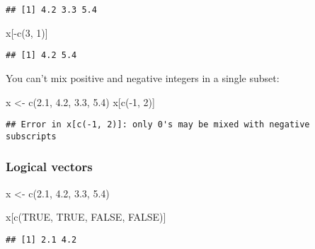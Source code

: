 \documentclass[
]{book}
\newenvironment{Shaded}{\begin{snugshade}}{\end{snugshade}}
\newcommand{\ConstantTok}[1]{\textcolor[rgb]{0.00,0.00,0.00}{#1}}
\newcommand{\DecValTok}[1]{\textcolor[rgb]{0.00,0.00,0.81}{#1}}
\newcommand{\FloatTok}[1]{\textcolor[rgb]{0.00,0.00,0.81}{#1}}
\newcommand{\FunctionTok}[1]{\textcolor[rgb]{0.00,0.00,0.00}{#1}}
\newcommand{\NormalTok}[1]{#1}
\newcommand{\OtherTok}[1]{\textcolor[rgb]{0.56,0.35,0.01}{#1}}
\newcommand{\SpecialCharTok}[1]{\textcolor[rgb]{0.00,0.00,0.00}{#1}}
\begin{document}
\begin{verbatim}
## [1] 4.2 3.3 5.4
\end{verbatim}

\begin{Shaded}
\begin{Highlighting}[]
\NormalTok{x[}\SpecialCharTok{{-}}\FunctionTok{c}\NormalTok{(}\DecValTok{3}\NormalTok{, }\DecValTok{1}\NormalTok{)]}
\end{Highlighting}
\end{Shaded}

\begin{verbatim}
## [1] 4.2 5.4
\end{verbatim}

You can't mix positive and negative integers in a single subset:

\begin{Shaded}
\begin{Highlighting}[]
\NormalTok{x }\OtherTok{\textless{}{-}} \FunctionTok{c}\NormalTok{(}\FloatTok{2.1}\NormalTok{, }\FloatTok{4.2}\NormalTok{, }\FloatTok{3.3}\NormalTok{, }\FloatTok{5.4}\NormalTok{)}
\NormalTok{x[}\FunctionTok{c}\NormalTok{(}\SpecialCharTok{{-}}\DecValTok{1}\NormalTok{, }\DecValTok{2}\NormalTok{)]}
\end{Highlighting}
\end{Shaded}

\begin{verbatim}
## Error in x[c(-1, 2)]: only 0's may be mixed with negative subscripts
\end{verbatim}

\hypertarget{logical-vectors}{%
\subsubsection{Logical vectors}\label{logical-vectors}}

\begin{Shaded}
\begin{Highlighting}[]
\NormalTok{x }\OtherTok{\textless{}{-}} \FunctionTok{c}\NormalTok{(}\FloatTok{2.1}\NormalTok{, }\FloatTok{4.2}\NormalTok{, }\FloatTok{3.3}\NormalTok{, }\FloatTok{5.4}\NormalTok{)}

\NormalTok{x[}\FunctionTok{c}\NormalTok{(}\ConstantTok{TRUE}\NormalTok{, }\ConstantTok{TRUE}\NormalTok{, }\ConstantTok{FALSE}\NormalTok{, }\ConstantTok{FALSE}\NormalTok{)]}
\end{Highlighting}
\end{Shaded}

\begin{verbatim}
## [1] 2.1 4.2
\end{verbatim}
\end{document}
